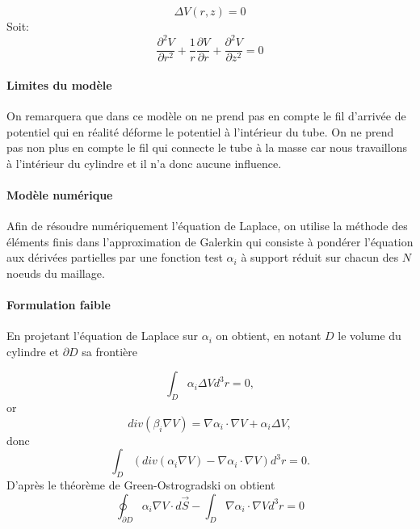 \documentclass[a4paper,12pt]{article}
\begin{document}
\begin{equation}
\Delta V(r,z)=0
\end{equation}
Soit:
\begin{equation}
\frac{\partial^2 V}{\partial r^2}+\frac{1}{r}\frac{\partial V}{ \partial r}+\frac{\partial^2 V}{\partial z^2}=0
\end{equation}

\paragraph{Limites du modèle}
On remarquera que dans ce modèle on ne prend pas en compte le fil d'arrivée de potentiel qui en réalité déforme le potentiel à l'intérieur du tube. On ne prend pas non plus en compte le fil qui connecte le tube à la masse car nous travaillons à l'intérieur du cylindre et il n'a donc aucune influence.

\paragraph{Modèle numérique}
Afin de résoudre numériquement l'équation de Laplace, on utilise la méthode des éléments finis dans l'approximation de Galerkin qui consiste à pondérer l'équation aux dérivées partielles par une fonction test $\alpha_i$ à support réduit sur chacun des $N$ noeuds du maillage.

\paragraph{Formulation faible}
En projetant l'équation de Laplace sur $\alpha_i$ on obtient, en notant $D$ le volume du cylindre et $\partial D$ sa frontière

\begin{equation}
\int_{D} \alpha_i \Delta V d^3r = 0,
\end{equation}
or
\begin{equation}
div(\beta_i \nabla V) = \nabla \alpha_i \cdot \nabla V + \alpha_i \Delta V,
\end{equation}
donc
\begin{equation}
\int_{D} \left( div(\alpha_i \nabla V) - \nabla\alpha_i \cdot \nabla V \right) d^3r = 0.
\end{equation}
D'après le théorème de Green-Ostrogradski on obtient
\begin{equation}
\oint_{\partial D} \alpha_i \nabla V \cdot d\vec{S} - \int_{D} \nabla \alpha_i \cdot \nabla V d^3 r = 0
\end{equation}
\end{document}
